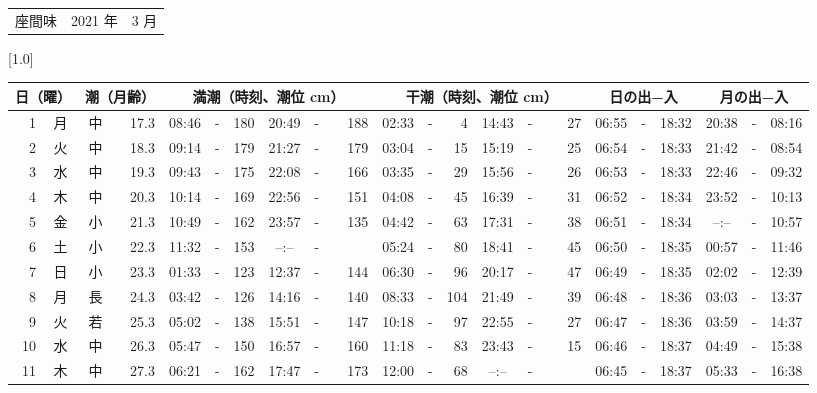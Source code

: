 \documentclass[12pt,a4j]{jsarticle}
\begin{document}
 \begin{table}[htbp]
 \begin{center}
 \begin{tabular}{lcc}
 \LARGE{座間味}  & \large{2021 年} & \large{ 3 月} \\
 \end{tabular}
 \end{center}
 \begin{center}
    \scalebox{0.7}[1.0]{
    \begin{tabular}{|rc|cr|ccrccr|ccrccr|ccc|ccc|}
    \hline
    \multicolumn{2}{|c|}{日（曜）} & \multicolumn{2}{c|}{潮（月齢）} & \multicolumn{6}{c|}{満潮（時刻、潮位 cm）} & \multicolumn{6}{c|}{干潮（時刻、潮位 cm）} & \multicolumn{3}{c|}{日の出−入} &  \multicolumn{3}{c|}{月の出−入}\\
 \hline
 1 & 月 & 中 & 17.3 &  08:46 &-& 180 &  20:49 &-& 188 &  02:33 &-&   4 &  14:43 &-&  27 & 06:55 & -& 18:32 & 20:38 & -& 08:16 \\
 2 & 火 & 中 & 18.3 &  09:14 &-& 179 &  21:27 &-& 179 &  03:04 &-&  15 &  15:19 &-&  25 & 06:54 & -& 18:33 & 21:42 & -& 08:54 \\
 3 & 水 & 中 & 19.3 &  09:43 &-& 175 &  22:08 &-& 166 &  03:35 &-&  29 &  15:56 &-&  26 & 06:53 & -& 18:33 & 22:46 & -& 09:32 \\
 4 & 木 & 中 & 20.3 &  10:14 &-& 169 &  22:56 &-& 151 &  04:08 &-&  45 &  16:39 &-&  31 & 06:52 & -& 18:34 & 23:52 & -& 10:13 \\
 5 & 金 & 小 & 21.3 &  10:49 &-& 162 &  23:57 &-& 135 &  04:42 &-&  63 &  17:31 &-&  38 & 06:51 & -& 18:34 & --:-- & -& 10:57 \\
 6 & 土 & 小 & 22.3 &  11:32 &-& 153 &  --:-- &-&~~~~~ &  05:24 &-&  80 &  18:41 &-&  45 & 06:50 & -& 18:35 & 00:57 & -& 11:46 \\
 7 & 日 & 小 & 23.3 &  01:33 &-& 123 &  12:37 &-& 144 &  06:30 &-&  96 &  20:17 &-&  47 & 06:49 & -& 18:35 & 02:02 & -& 12:39 \\
 8 & 月 & 長 & 24.3 &  03:42 &-& 126 &  14:16 &-& 140 &  08:33 &-& 104 &  21:49 &-&  39 & 06:48 & -& 18:36 & 03:03 & -& 13:37 \\
 9 & 火 & 若 & 25.3 &  05:02 &-& 138 &  15:51 &-& 147 &  10:18 &-&  97 &  22:55 &-&  27 & 06:47 & -& 18:36 & 03:59 & -& 14:37 \\
10 & 水 & 中 & 26.3 &  05:47 &-& 150 &  16:57 &-& 160 &  11:18 &-&  83 &  23:43 &-&  15 & 06:46 & -& 18:37 & 04:49 & -& 15:38 \\
11 & 木 & 中 & 27.3 &  06:21 &-& 162 &  17:47 &-& 173 &  12:00 &-&  68 &  --:-- &-&~~~~~ & 06:45 & -& 18:37 & 05:33 & -& 16:38 \\

\end{tabular}}
\end{center}
\end{table}
\end{document}
